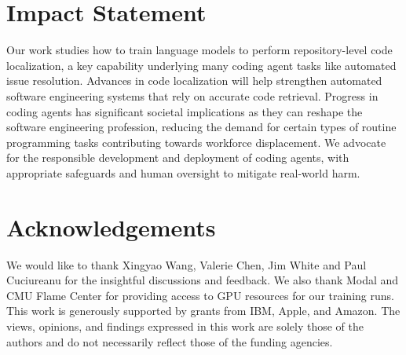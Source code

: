 \section*{Impact Statement}
Our work studies how to train language models to perform repository-level code localization, a key capability underlying many coding agent tasks like automated issue resolution. Advances in code localization will help strengthen automated software engineering systems that rely on accurate code retrieval. Progress in coding agents has significant societal implications as they can reshape the software engineering profession, reducing the demand for certain types of routine programming tasks contributing towards workforce displacement. We advocate for the responsible development and deployment of coding agents, with appropriate safeguards and human oversight to mitigate real-world harm.

\section*{Acknowledgements}
We would like to thank Xingyao Wang, Valerie Chen, Jim White and Paul Cuciureanu for the insightful discussions and feedback. We also thank Modal and CMU Flame Center for providing access to GPU resources for our training runs. This work is generously supported by grants from IBM, Apple, and Amazon. The views, opinions, and findings expressed in this work are solely those of the authors and do not necessarily reflect those of the funding agencies.